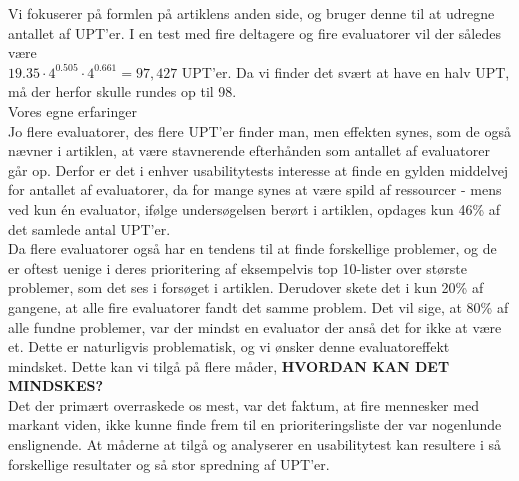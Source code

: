 \documentclass[12pt]{article}
\begin{document}
\noindent Vi fokuserer på formlen på artiklens anden side, og bruger denne til at udregne antallet af UPT'er. I en test med fire deltagere og fire evaluatorer vil der således være \\ 
$19.35 \cdot 4^{0.505} \cdot 4^{0.661} = 97,427$ UPT'er. Da vi finder det svært at have en halv UPT, må der herfor skulle rundes op til 98.\\

\noindent Vores egne erfaringer\\

\noindent Jo flere evaluatorer, des flere UPT'er finder man, men effekten synes, som de også nævner i artiklen, at være stavnerende efterhånden som antallet af evaluatorer går op. Derfor er det i enhver usabilitytests interesse at finde en gylden middelvej for antallet af evaluatorer, da for mange synes at være spild af ressourcer - mens ved kun én evaluator, ifølge undersøgelsen berørt i artiklen, opdages kun 46\% af det samlede antal UPT'er.\\

\noindent Da flere evaluatorer også har en tendens til at finde forskellige problemer, og de er oftest uenige i deres prioritering af eksempelvis top 10-lister over største problemer, som det ses i forsøget i artiklen. Derudover skete det i kun 20\% af gangene, at alle fire evaluatorer fandt det samme problem. Det vil sige, at 80\% af alle fundne problemer, var der mindst en evaluator der anså det for ikke at være et. Dette er naturligvis problematisk, og vi ønsker denne evaluatoreffekt mindsket. Dette kan vi tilgå på flere måder, \textbf{HVORDAN KAN DET MINDSKES?}\\

\noindent Det der primært overraskede os mest, var det faktum, at fire mennesker med markant viden, ikke kunne finde frem til en prioriteringsliste der var nogenlunde enslignende. At måderne at tilgå og analyserer en usabilitytest kan resultere i så forskellige resultater og så stor spredning af UPT'er.\\
\end{document}
